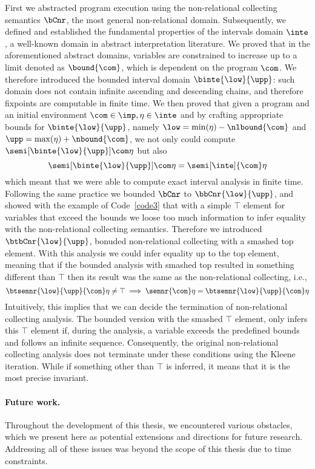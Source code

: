 First we abstracted program execution using the non-relational
collecting semantics \(\bCnr\), the most general non-relational
domain. Subsequently, we defined and established the fundamental
properties of the intervals domain \(\inte\), a well-known domain in
abstract interpretation literature. We proved that in the
aforementioned abstract domains, variables are constrained to increase
up to a limit denoted as \(\bound{\com}\), which is dependent on the
program \(\com\). We therefore introduced the bounded interval domain
\(\binte{\low}{\upp}\): such domain does not contain infinite
ascending and descending chains, and therefore fixpoints are
computable in finite time. We then proved that given a program and an
initial environment \(\com\in\imp, \eta\in\inte\) and by crafting
appropriate bounds for \(\binte{\low}{\upp}\), namely
\(\low = \min(\eta) - \nlbound{\com}\) and
\(\upp = \max(\eta) + \nbound{\com}\), we not only could compute
\(\semi[\binte{\low}{\upp}]{\com}\eta\) but
also \[\semi[\binte{\low}{\upp}]{\com}\eta = \semi[\inte]{\com}\eta\]
which meant that we were able to compute exact interval analysis in
finite time. Following the same practice we bounded \(\bCnr\) to
\(\bbCnr{\low}{\upp}\), and showed with the example of
Code~\ref{code3} that with a simple \(\top\) element for variables
that exceed the bounds we loose too much information to infer equality
with the non-relational collecting semantics.  Therefore we introduced
\(\btbCnr{\low}{\upp}\), bonuded non-relational collecting with a
smashed top element. With this analysis we could infer equality up to
the top element, meaning that if the bounded analysis with smashed top
resulted in something different than \(\top\) then its result was the
same as the non-relational collecting, i.e.,
\[\btsemnr{\low}{\upp}{\com}\eta \neq \top \implies \semnr{\com}\eta =
  \btsemnr{\low}{\upp}{\com}\eta\] Intuitively, this implies that we
can decide the termination of non-relational collecting analysis. The
bounded version with the smashed \(\top\) element, only infers this
\(\top\) element if, during the analysis, a variable exceeds the
predefined bounds and follows an infinite sequence. Consequently, the
original non-relational collecting analysis does not terminate under
these conditions using the Kleene iteration. While if something other
than \(\top\) is inferred, it means that it is the most precise
invariant.

\paragraph*{Future work.}
Throughout the development of this thesis, we encountered various
obstacles, which we present here as potential extensions and
directions for future research. Addressing all of these issues was
beyond the scope of this thesis due to time constraints.

